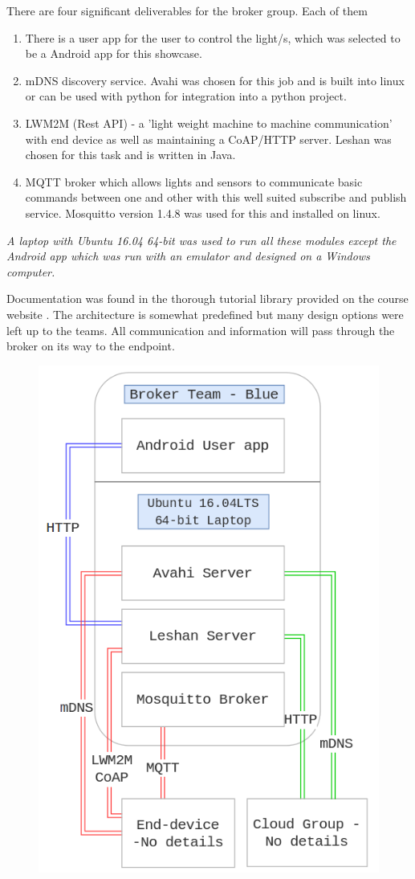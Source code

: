 \documentclass[11pt]{article}
\begin{document}
There are four significant deliverables for the broker group. Each of them 
\begin{enumerate}
	\item There is a user app for the user to control the light/s, which was selected to be a Android app for this showcase.
	\item mDNS discovery service. Avahi was chosen for this job and is built into linux or can be used with python for integration into a python project.
	\item LWM2M (Rest API) - a 'light weight machine to machine communication' with end device as well as maintaining a CoAP/HTTP server. Leshan was chosen for this task and is written in Java.
	\item MQTT broker which allows lights and sensors to communicate basic commands between one and other with this well suited subscribe and publish service. Mosquitto version 1.4.8 was used for this and installed on linux.
\end{enumerate}

\textit{A laptop with Ubuntu 16.04 64-bit was used to run all these modules except the Android app which was run with an emulator and designed on a Windows computer.}

Documentation was found in the thorough tutorial library provided on the course website \cite{tut}. The architecture is somewhat predefined but many design options were left up to the teams. All communication and information will pass through the broker on its way to the endpoint.

\begin{figure}[h]
	\begin{center}
		\includegraphics[width=0.6\linewidth]{img/overview}
		\caption{}
		\label{fig:fig2}
	\end{center}
\end{figure}
\end{document}
